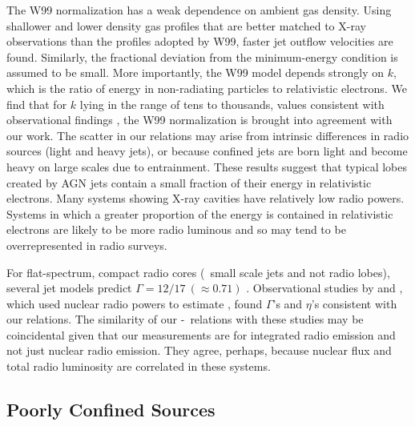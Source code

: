 \documentclass[12pt, preprint]{aastex}
\begin{document}
The W99 normalization has a weak dependence on ambient gas density.
Using shallower and lower density gas profiles that are better matched
to X-ray observations than the profiles adopted by W99, faster jet
outflow velocities are found. Similarly, the fractional deviation from
the minimum-energy condition is assumed to be small. More importantly,
the W99 model depends strongly on $k$, which is the ratio of energy in
non-radiating particles to relativistic electrons. We find that for
$k$ lying in the range of tens to thousands, values consistent with
observational findings \citep{2005MNRAS.364.1343D,
  2006MNRAS.372.1741D, 2006ApJ...648..200D, birzan08}, the W99
normalization is brought into agreement with our work. The scatter in
our relations may arise from intrinsic differences in radio sources
(light and heavy jets), or because confined jets are born light and
become heavy on large scales due to entrainment. These results suggest
that typical lobes created by AGN jets contain a small fraction of
their energy in relativistic electrons. Many systems showing X-ray
cavities have relatively low radio powers.  Systems in which a greater
proportion of the energy is contained in relativistic electrons are
likely to be more radio luminous and so may tend to be overrepresented
in radio surveys.

For flat-spectrum, compact radio cores (\ie\ small scale jets and not
radio lobes), several jet models predict $\Gamma = 12/17 ~(\approx
0.71)$ \citep{1979ApJ...232...34B, 1995A&A...293..665F,
  2003MNRAS.343L..59H}. Observational studies by
\citet{2005ApJ...633..384H} and \citet{2007MNRAS.381..589M}, which
used nuclear radio powers to estimate \pjet, found $\Gamma$'s and
$\eta$'s consistent with our relations. The similarity of our
\pjet-\prad\ relations with these studies may be coincidental given
that our measurements are for integrated radio emission and not just
nuclear radio emission. They agree, perhaps, because nuclear flux and
total radio luminosity are correlated in these systems.

\subsection{Poorly Confined Sources}
\label{sec:jet}
\end{document}
